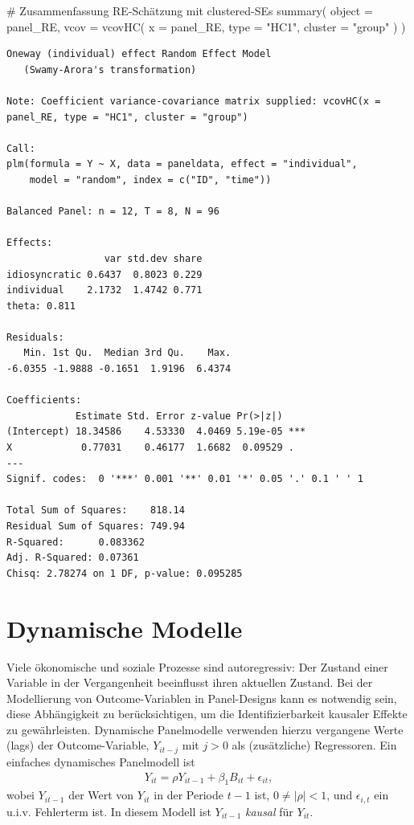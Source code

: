 \documentclass[
  a4paper,
  DIV=11,
  oneside]{scrreprt}
\newenvironment{Shaded}{\begin{snugshade}}{\end{snugshade}}
\newcommand{\AttributeTok}[1]{\textcolor[rgb]{0.40,0.45,0.13}{#1}}
\newcommand{\CommentTok}[1]{\textcolor[rgb]{0.37,0.37,0.37}{#1}}
\newcommand{\FunctionTok}[1]{\textcolor[rgb]{0.28,0.35,0.67}{#1}}
\newcommand{\NormalTok}[1]{\textcolor[rgb]{0.00,0.23,0.31}{#1}}
\newcommand{\StringTok}[1]{\textcolor[rgb]{0.13,0.47,0.30}{#1}}
\begin{document}
\begin{Shaded}
\begin{Highlighting}[]
\CommentTok{\# Zusammenfassung RE{-}Schätzung mit clustered{-}SEs}
\FunctionTok{summary}\NormalTok{(}
  \AttributeTok{object =}\NormalTok{ panel\_RE, }
  \AttributeTok{vcov =} \FunctionTok{vcovHC}\NormalTok{(}
    \AttributeTok{x =}\NormalTok{ panel\_RE, }
    \AttributeTok{type =} \StringTok{"HC1"}\NormalTok{, }
    \AttributeTok{cluster =} \StringTok{"group"}
\NormalTok{  )}
\NormalTok{)}
\end{Highlighting}
\end{Shaded}

\begin{verbatim}
Oneway (individual) effect Random Effect Model 
   (Swamy-Arora's transformation)

Note: Coefficient variance-covariance matrix supplied: vcovHC(x = panel_RE, type = "HC1", cluster = "group")

Call:
plm(formula = Y ~ X, data = paneldata, effect = "individual", 
    model = "random", index = c("ID", "time"))

Balanced Panel: n = 12, T = 8, N = 96

Effects:
                 var std.dev share
idiosyncratic 0.6437  0.8023 0.229
individual    2.1732  1.4742 0.771
theta: 0.811

Residuals:
   Min. 1st Qu.  Median 3rd Qu.    Max. 
-6.0355 -1.9888 -0.1651  1.9196  6.4374 

Coefficients:
            Estimate Std. Error z-value Pr(>|z|)    
(Intercept) 18.34586    4.53330  4.0469 5.19e-05 ***
X            0.77031    0.46177  1.6682  0.09529 .  
---
Signif. codes:  0 '***' 0.001 '**' 0.01 '*' 0.05 '.' 0.1 ' ' 1

Total Sum of Squares:    818.14
Residual Sum of Squares: 749.94
R-Squared:      0.083362
Adj. R-Squared: 0.07361
Chisq: 2.78274 on 1 DF, p-value: 0.095285
\end{verbatim}

\section{Dynamische Modelle}\label{dynamische-modelle}

Viele ökonomische und soziale Prozesse sind autoregressiv: Der Zustand
einer Variable in der Vergangenheit beeinflusst ihren aktuellen Zustand.
Bei der Modellierung von Outcome-Variablen in Panel-Designs kann es
notwendig sein, diese Abhängigkeit zu berücksichtigen, um die
Identifizierbarkeit kausaler Effekte zu gewährleisten. Dynamische
Panelmodelle verwenden hierzu vergangene Werte (lags) der
Outcome-Variable, \(Y_{it-j}\) mit \(j>0\) als (zusätzliche)
Regressoren. Ein einfaches dynamisches Panelmodell ist \begin{align}
  Y_{it} = \rho Y_{it-1} + \beta_1 B_{it} + \epsilon_{it}, \label{eq:dynpanel}
\end{align} wobei \(Y_{it-1}\) der Wert von \(Y_{it}\) in der Periode
\(t-1\) ist, \(0\neq\lvert\rho\rvert<1\), und \(\epsilon_{i,t}\) ein
u.i.v. Fehlerterm ist. In diesem Modell ist \(Y_{it-1}\) \emph{kausal}
für \(Y_{it}\).
\end{document}
